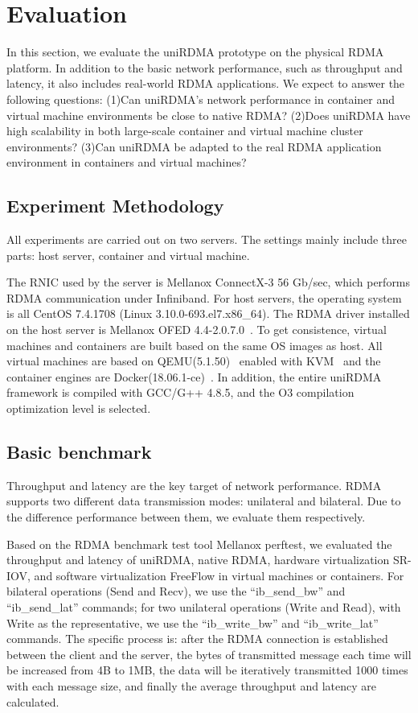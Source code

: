 \section{Evaluation}
In this section, we evaluate the uniRDMA prototype on the physical RDMA platform. In addition to the basic network performance, such as throughput and latency, it also includes real-world RDMA applications. We expect to answer the following questions:
(1)Can uniRDMA's network performance in container and virtual machine environments be close to native RDMA?
(2)Does uniRDMA have high scalability in both large-scale container and virtual machine cluster environments?
(3)Can uniRDMA be adapted to the real RDMA application environment in containers and virtual machines?

\subsection{Experiment Methodology}
All experiments are carried out on two servers. The settings mainly include three parts: host server, container and virtual machine. 

The RNIC used by the server is Mellanox ConnectX-3 56 Gb/sec, which performs RDMA communication under Infiniband. For host servers, the operating system is all CentOS 7.4.1708 (Linux 3.10.0-693.el7.x86\_64). The RDMA driver installed on the host server is Mellanox OFED 4.4-2.0.7.0~\cite{mlnx-ofed}. To get consistence, virtual machines and containers are built based on the same OS images as host. All virtual machines are based on QEMU(5.1.50)~\cite{qemu} enabled with KVM~\cite{kvm} and the container engines are Docker(18.06.1-ce)~\cite{docker}. In addition, the entire uniRDMA framework is compiled with GCC/G++ 4.8.5, and the O3 compilation optimization level is selected. 

\subsection{Basic benchmark}
Throughput and latency are the key target of network performance. RDMA supports two different data transmission modes: unilateral and bilateral. Due to the difference performance between them, we evaluate them respectively.

Based on the RDMA benchmark test tool Mellanox perftest, we evaluated the throughput and latency of uniRDMA, native RDMA, hardware virtualization SR-IOV, and software virtualization FreeFlow in virtual machines or containers. For bilateral operations (Send and Recv), we use the ``ib\_send\_bw'' and ``ib\_send\_lat'' commands; for two unilateral operations (Write and Read), with Write as the representative, we use the ``ib\_write\_bw'' and ``ib\_write\_lat'' commands. The specific process is: after the RDMA connection is established between the client and the server, the bytes of transmitted message each time will be increased from 4B to 1MB, the data will be iteratively transmitted 1000 times with each message size, and finally the average throughput and latency are calculated.

